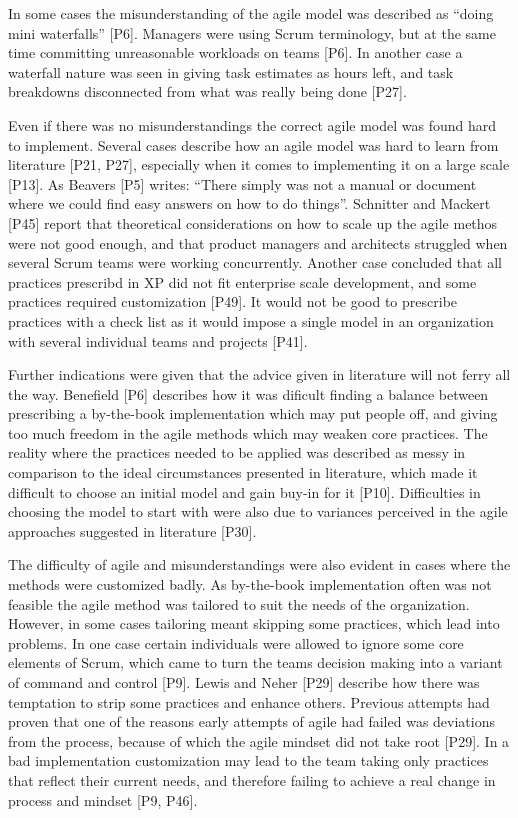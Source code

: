 \documentclass[preprint,authoryear,12pt]{elsarticle}
\begin{document}
In some cases the misunderstanding of the agile model was described as ``doing
mini waterfalls'' [P6]. Managers were using Scrum terminology, but at the same
time committing unreasonable workloads on teams [P6]. In another case a
waterfall nature was seen in giving task estimates as hours left, and task
breakdowns disconnected from what was really being done [P27].


Even if there was no misunderstandings the correct agile model was found hard to
implement. Several cases describe how an agile model was hard to learn from
literature [P21, P27], especially when it comes to implementing it on a large
scale [P13]. As Beavers [P5] writes: ``There simply was not a manual or document
where we could find easy answers on how to do things''.
Schnitter and Mackert [P45] report that theoretical considerations on how to
scale up the agile methos were not good enough, and that product managers and
architects struggled when several Scrum teams were working concurrently.
Another case concluded that all practices prescribd in XP did not fit enterprise
scale development, and some practices required customization [P49]. It would not
be good to prescribe practices with a check list as it would impose a single
model in an organization with several individual teams and projects [P41].

Further indications were given that the advice given in literature will not
ferry all the way. Benefield [P6] describes how it was dificult finding a
balance between prescribing a by-the-book implementation which may put people
off, and giving too much freedom in the agile methods which may weaken core
practices.
The reality where the practices needed to be applied was described as
messy in comparison to the ideal circumstances presented in literature, which
made it difficult to choose an initial model and gain buy-in for it [P10].
Difficulties in choosing the model to start with were also due to variances
perceived in the agile approaches suggested in literature [P30].


The difficulty of agile and misunderstandings were also evident in cases where
the methods were customized badly. As by-the-book implementation often was not
feasible the agile method was tailored to suit the needs of the organization.
However, in some cases tailoring meant skipping some practices, which lead into
problems. In one case certain individuals were allowed to ignore some core
elements of Scrum, which came to turn the teams decision making into a variant
of command and control [P9].
Lewis and Neher [P29] describe how there was temptation to strip some practices
and enhance others. Previous attempts had proven that one of the reasons early
attempts of agile had failed was deviations from the process, because of which
the agile mindset did not take root [P29]. In a bad implementation customization
may lead to the team taking only practices that reflect their current needs, and
therefore failing to achieve a real change in process and mindset [P9, P46].
\end{document}
